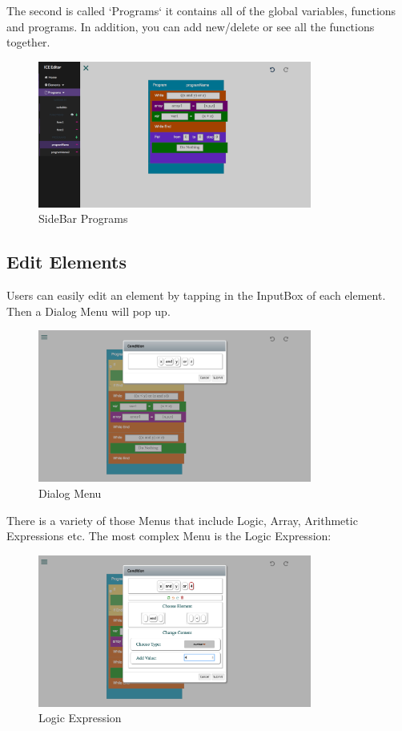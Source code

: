 \documentclass[paper=a4, fontsize=11pt]{scrartcl}
\begin{document}
		The second is called `Programs` it contains all of the global variables, functions and programs. In addition, you can add new/delete or see all the functions together.
		\begin{figure}[ht!]
		\centering
		\includegraphics[width=90mm]{images/sideBarPrograms.jpg}
		\caption{SideBar Programs \label{sideBarPrograms}}
		\end{figure}

	\subsection{Edit Elements}
		Users can easily edit an element by tapping in the InputBox of each element. Then a Dialog Menu will pop up.
		\begin{figure}[ht!]
		\centering
		\includegraphics[width=90mm]{images/logicCondition.jpg}
		\caption{Dialog Menu \label{logicCondition}}
		\end{figure}

		There is a variety of those Menus that include Logic, Array, Arithmetic Expressions etc. The most complex Menu is the Logic Expression:
		\begin{figure}[ht!]
		\centering
		\includegraphics[width=90mm]{images/editCondition.jpg}
		\caption{Logic Expression \label{editCondition}}
		\end{figure}	
\end{document}
